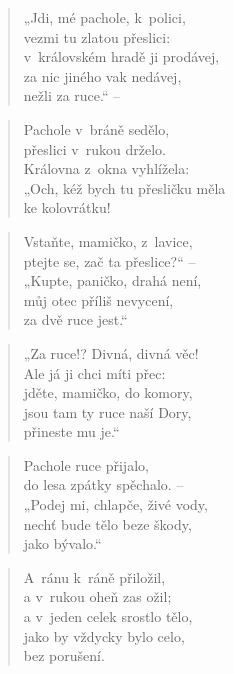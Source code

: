 \begin{verse}
„Jdi, mé pachole, k~polici, \\
vezmi tu zlatou přeslici: \\
v~královském hradě ji prodávej, \\
za nic jiného vak nedávej, \\
nežli za ruce.“ --
\end{verse}

\begin{verse}
Pachole v~bráně sedělo, \\
přeslici v~rukou drželo. \\
Královna z~okna vyhlížela: \\
„Och, kéž bych tu přesličku měla \\
ke kolovrátku!
\end{verse}

\begin{verse}
Vstaňte, mamičko, z~lavice, \\
ptejte se, zač ta přeslice?“ -- \\
„Kupte, paničko, drahá není, \\
můj otec příliš nevycení, \\
za dvě ruce jest.“
\end{verse}

\begin{verse}
„Za ruce!? Divná, divná věc! \\
Ale já ji chci míti přec: \\
jděte, mamičko, do komory, \\
jsou tam ty ruce naší Dory, \\
přineste mu je.“
\end{verse}

\begin{verse}
Pachole ruce přijalo, \\
do lesa zpátky spěchalo. -- \\
„Podej mi, chlapče, živé vody, \\
nechť bude tělo beze škody, \\
jako bývalo.“
\end{verse}

\begin{verse}
A~ránu k~ráně přiložil, \\
a v~rukou oheň zas ožil; \\
a v~jeden celek srostlo tělo, \\
jako by vždycky bylo celo, \\
bez porušení.
\end{verse}

